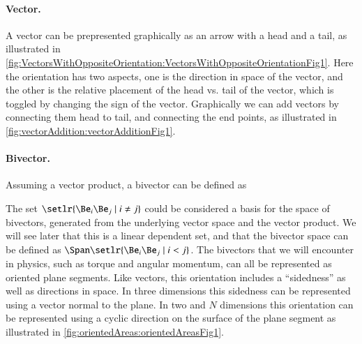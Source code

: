 \paragraph{Vector.}
A vector can be prepresented graphically as an arrow with a head and a tail, as illustrated in
\cref{fig:VectorsWithOppositeOrientation:VectorsWithOppositeOrientationFig1}.
Here the orientation has two aspects, one is the direction in space of the vector, and the other is the relative placement of the head vs. tail of the vector, which is toggled by changing the sign of the vector.
Graphically we can add vectors by connecting them head to tail, and connecting the end points, as illustrated in
\cref{fig:vectorAddition:vectorAdditionFig1}.

\paragraph{Bivector.}

Assuming a vector product, a bivector can be defined as


The set \( \setlr{ \Be_i \Be_j \mid i \ne j } \) could be considered a basis for the space of bivectors, generated from the underlying vector space and the vector product.
We will see later that this is a linear dependent set, and that the bivector space can be defined as \( \Span \setlr{ \Be_i \Be_j \mid i < j } \).
The bivectors that we will encounter in physics, such as torque and angular momentum, can all be represented as oriented plane
segments.
Like vectors, this orientation includes a ``sidedness'' as well as directions in space.
In three dimensions this sidedness can be represented using a vector normal to the plane.  In two and \( N \) dimensions this orientation can be 
represented using a cyclic direction on the surface of the plane segment as illustrated in
\cref{fig:orientedAreas:orientedAreasFig1}.

